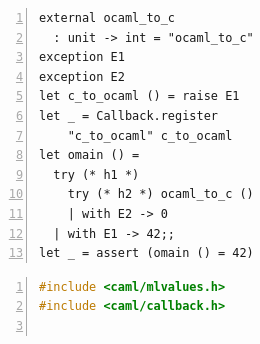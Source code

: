 \documentclass[sigplan,10pt,review,anonymous]{acmart}\settopmatter{printfolios=true,printccs=false,printacmref=false}
\begin{document}
\begin{figure}
\begin{minipage}{0.30\linewidth}
  \begin{minipage}{\linewidth}
    \begin{lstlisting}[numbers=left]
external ocaml_to_c
  : unit -> int = "ocaml_to_c"
exception E1
exception E2
let c_to_ocaml () = raise E1
let _ = Callback.register
    "c_to_ocaml" c_to_ocaml
let omain () =
  try (* h1 *)
    try (* h2 *) ocaml_to_c ()
    | with E2 -> 0
  | with E1 -> 42;;
let _ = assert (omain () = 42)
    \end{lstlisting}
    \vspace{-2mm}
    \label{code:meander_ml}
  \end{minipage}
  \begin{minipage}{\linewidth}
    \begin{lstlisting}[language=c,numbers=left]
#include <caml/mlvalues.h>
#include <caml/callback.h>


\end{lstlisting}
\end{minipage}
\end{minipage}
\end{figure}
\end{document}
